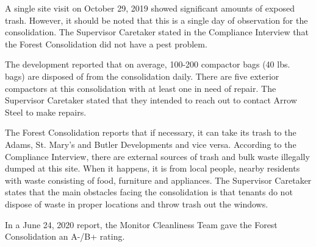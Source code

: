 A single site visit on October 29, 2019 showed significant amounts of exposed trash.  However, it should be noted that this is a single day of observation for the consolidation. The Supervisor Caretaker stated in the Compliance Interview that the Forest Consolidation did not have a pest problem.  

The development reported that on average, 100-200 compactor bags (40 lbs. bags) are disposed of from the consolidation daily. There are five exterior compactors at this consolidation with at least one in need of repair. The Supervisor Caretaker stated that they intended to reach out to contact Arrow Steel to make repairs. 

The Forest Consolidation reports that if necessary, it can take its trash to the Adams, St. Mary's and Butler Developments and vice versa. According to the Compliance Interview, there are external sources of trash and bulk waste illegally dumped at this site. When it happens, it is from local people, nearby residents with waste consisting of food, furniture and appliances. The Supervisor Caretaker states that the main obstacles facing the consolidation is that tenants do not dispose of waste in proper locations and throw trash out the windows. 

In a June 24, 2020 report, the Monitor Cleanliness Team gave the Forest Consolidation an A-/B+ rating.